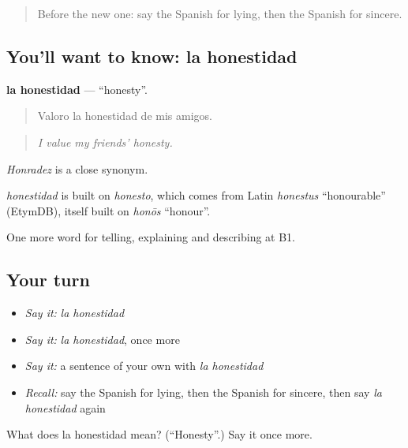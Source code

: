 \label{lesson:ES-C724-honestidad}



\begin{quote}
Before the new one: say the Spanish for lying, then the Spanish for sincere.
\end{quote}

\subsection*{You'll want to know: la honestidad}
\textbf{la honestidad} — \textquotedblleft{}honesty\textquotedblright{}.

\begin{quote}
Valoro la honestidad de mis amigos.
\end{quote}

\begin{quote}
\emph{I value my friends' honesty.}
\end{quote}

\emph{Honradez} is a close synonym.

\begin{cousinweb}
\emph{honestidad} is built on \emph{honesto}, which comes from Latin \emph{honestus} \textquotedblleft{}honourable\textquotedblright{} (EtymDB), itself built on \emph{honōs} \textquotedblleft{}honour\textquotedblright{}.
\end{cousinweb}

\begin{grammarlens}[title={What you've built}]
One more word for telling, explaining and describing at B1.
\end{grammarlens}

\subsection*{Your turn}
\begin{itemize}
\raggedright
  \item \emph{Say it:} \emph{la honestidad}
  \item \emph{Say it:} \emph{la honestidad}, once more
  \item \emph{Say it:} a sentence of your own with \emph{la honestidad}
  \item \emph{Recall:} say the Spanish for lying, then the Spanish for sincere, then say \emph{la honestidad} again
\end{itemize}

\begin{tcolorbox}[breakable,colback=teal!4,colframe=teal!35!black,title={Before you move on}]
What does la honestidad mean? (\textquotedblleft{}Honesty\textquotedblright{}.) Say it once more.
\end{tcolorbox}
